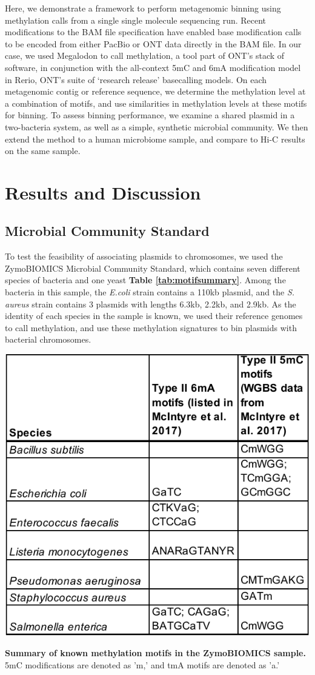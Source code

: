 Here, we demonstrate a framework to perform metagenomic binning using methylation calls from a single single molecule sequencing run. Recent modifications to the BAM file specification have enabled base modification calls to be encoded from either PacBio or ONT data directly in the BAM file.  In our case, we used Megalodon to call methylation, a tool part of ONT’s stack of software, in conjunction with the all-context 5mC and 6mA modification model in Rerio, ONT’s suite of ‘research release’ basecalling models. On each metagenomic contig or reference sequence, we determine the methylation level at a combination of motifs, and use similarities in methylation levels at these motifs for binning. To assess binning performance, we examine a shared plasmid in a two-bacteria system, as well as a simple, synthetic microbial community. We then extend the method to a human microbiome sample, and compare to Hi-C results on the same sample.


\section{Results and Discussion}
\label{sec:results}

\subsection{Microbial Community Standard}
\label{sec:zymo}

To test the feasibility of associating plasmids to chromosomes, we used the ZymoBIOMICS Microbial Community Standard, which contains seven different species of bacteria and one yeast {\bf Table \ref{tab:motifsummary}}. Among the bacteria in this sample, the \textit{E.coli} strain contains a 110kb plasmid, and the \textit{S. aureus} strain contains 3 plasmids with lengths 6.3kb, 2.2kb, and 2.9kb. As the identity of each species in the sample is known, we used their reference genomes to call methylation, and use these methylation signatures to bin plasmids with bacterial chromosomes.




\begin{table}[!hb]
\centering
\includegraphics[width = .5\linewidth,keepaspectratio]{figure/motifsummary.pdf}
\caption[Summary of known methylation motifs in the ZymoBIOMICS sample]{{\bf Summary of known methylation motifs in the ZymoBIOMICS sample.} 5mC modifications are denoted as 'm,' and tmA motifs are denoted as 'a.' }
\label{tab:motifsummary}
\end{table}



